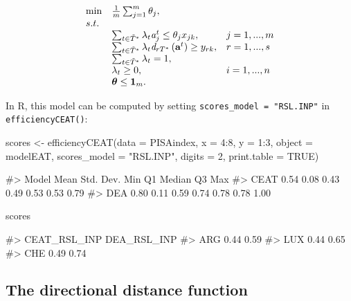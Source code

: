 \begin{equation} \label{(26)} 
\begin{array}{lllll} 
{} & {\min } & {\frac{1}{m} \sum_{j=1}^{m}\theta_{j},  } & {} & {} \\ 
{} & {s.t.} & {} & {} & {} \\ 
{} & {} & {\sum_{t\in \tilde{T}^{*} }^{}\lambda_{t} {\it a}_{j}^{t}  \le \theta_{j} x_{jk} ,} & {j=1,...,m} & {} \\ 
{} & {} & {\sum_{t\in \tilde{T}^{*} }^{}\lambda_{t} {\it d}_{rT^{*}} \left({\it \textbf{a}}^{t} \right) \ge y_{rk} ,} & {r=1,...,s} & {} \\ 
{} & {} & {\sum_{t\in \tilde{T}^{*} }^{}\lambda_{t}  =1,} & {} & {} \\ 
{} & {} & {\lambda _{t} \ge 0,} & {i=1,...,n} & {} \\ 
{} & {} & {{\it \boldsymbol{\theta}}\le {\bf 1}_{m}.}
\end{array} 
\end{equation}

In R, this model can be computed by setting
\texttt{scores\_model\ =\ "RSL.INP"} in \texttt{efficiencyCEAT()}:

\begin{Schunk}
\begin{Sinput}
scores <- efficiencyCEAT(data = PISAindex, x = 4:8, y = 1:3, object = modelEAT, 
                         scores_model = "RSL.INP", digits = 2,
                         print.table = TRUE)
\end{Sinput}
\begin{Soutput}
#>  Model Mean Std. Dev.  Min   Q1 Median   Q3  Max
#>   CEAT 0.54      0.08 0.43 0.49   0.53 0.53 0.79
#>    DEA 0.80      0.11 0.59 0.74   0.78 0.78 1.00
\end{Soutput}
\begin{Sinput}
scores %>% sample_n(3)
\end{Sinput}
\begin{Soutput}
#>     CEAT_RSL_INP DEA_RSL_INP
#> ARG         0.44        0.59
#> LUX         0.44        0.65
#> CHE         0.49        0.74
\end{Soutput}
\end{Schunk}

\hypertarget{the-directional-distance-function}{%
\subsection{The directional distance
function}\label{the-directional-distance-function}}

